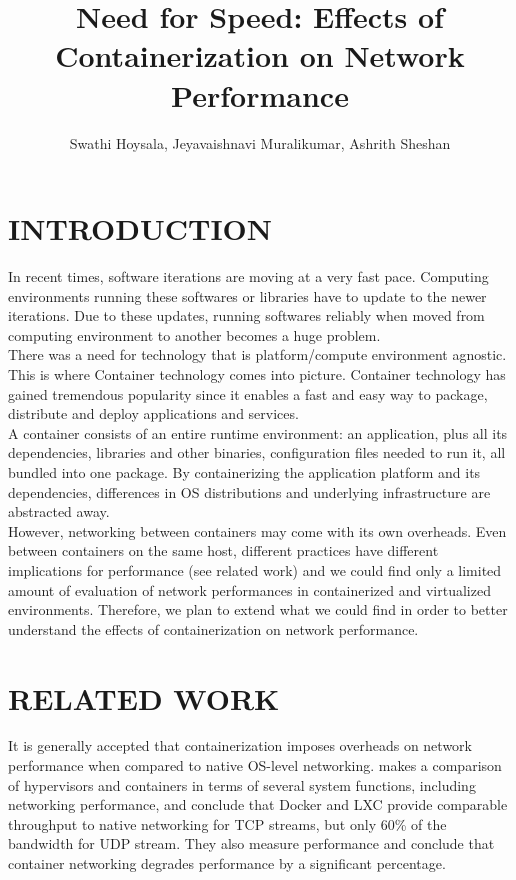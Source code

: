 \documentclass[letterpaper, 10 pt, conference]{ieeeconf}  %
\title{\LARGE \bf
Need for Speed: Effects of Containerization on Network Performance
}
\author{Swathi Hoysala, Jeyavaishnavi Muralikumar, Ashrith Sheshan %
}
\begin{document}
\maketitle
\thispagestyle{empty}
\pagestyle{empty}




\section{INTRODUCTION}
In recent times, software iterations are moving at a very fast pace. Computing environments running these softwares or libraries have to update to the newer iterations. Due to these updates, running softwares reliably when moved from computing environment to another becomes a huge problem.
\\
There was a need for technology that is platform/compute environment agnostic. This is where Container technology comes into picture. Container technology has gained tremendous popularity since it enables a fast and easy way to package, distribute and deploy applications and services.\\
A container consists of an entire runtime environment: an application, plus all its dependencies, libraries and other binaries, configuration files needed to run it, all bundled into one package. By containerizing the application platform and its dependencies, differences in OS distributions and underlying infrastructure are abstracted away. \\
However, networking between containers may come with its own overheads. Even between containers on the same host, different practices have different implications for performance (see related work) and we could find only a limited amount of evaluation of network performances in containerized and virtualized environments. Therefore, we plan to extend what we could find in order to better understand the effects of containerization on network performance. 

\section{RELATED WORK}

It is generally accepted that containerization imposes overheads on network performance when compared to native OS-level networking. \cite{morabito2015hypervisors} makes a comparison of hypervisors and containers in terms of several system functions, including networking performance, and conclude that Docker and LXC provide comparable throughput to native networking for TCP streams, but only 60\% of the bandwidth for UDP stream. They also measure performance and conclude that container networking degrades performance by a significant percentage.
\end{document}
